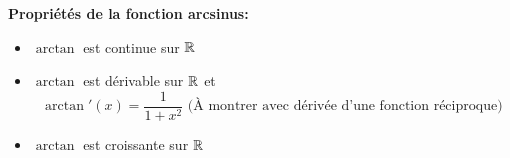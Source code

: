 \textbf{Propriétés de la fonction arcsinus: }
\begin{itemize}[label=$\bullet$, leftmargin=2cm]
\item $\arctan$ est continue sur  $\mathbb{R}$
\item $\arctan$ est dérivable sur $\mathbb{R}$ et
  \[
    \arctan'(x)=\frac{1}{1+x^2} \text{ (À montrer avec dérivée
      d'une fonction réciproque)}
  \]
\item $\arctan$ est croissante sur $\mathbb{R}$
\end{itemize}

